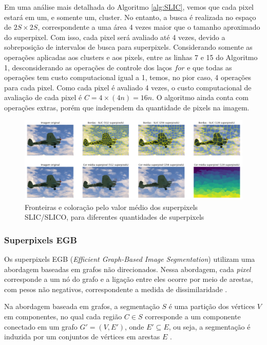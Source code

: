 \begin{document}
Em uma análise mais detalhada do Algoritmo \ref{alg:SLIC}, vemos que cada pixel estará em um, e somente um, cluster. No entanto, a busca é realizada no espaço de $2S \times 2S$, correspondente a uma área 4 vezes maior que o tamanho aproximado do superpixel. Com isso, cada pixel será avaliado até 4 vezes, devido a sobreposição de intervalos de busca para superpixels. Considerando somente as operações aplicadas aos clusters e aos pixels, entre as linhas 7 e 15 do Algoritmo 1, desconsiderando as operações de controle dos laços $for$ e que todas as operações tem custo computacional igual a 1, temos, no pior caso, 4 operações para cada pixel. Como cada pixel é avaliado 4 vezes, o custo computacional de avaliação de cada pixel é $C = 4 \times (4n) = 16n$. O algoritmo ainda conta com operações extras, porém que independem da quantidade de pixels na imagem. 

\begin{figure}[ht]
\centering
\includegraphics[width=1.\textwidth]{slic_segmentation_compare.png}
\caption{Fronteiras e coloração pelo valor médio dos superpixels SLIC/SLICO, para diferentes quantidades de superpixels}
\label{fig:SLICO}
\end{figure}


\subsubsection{Superpixels EGB} \label{sssec:egb}

Os superpixels EGB (\textit{Efficient Graph-Based Image Segmentation}) utilizam uma abordagem baseadas em grafos não direcionados. Nessa abordagem, cada \textit{pixel} corresponde a um nó do grafo e a ligação entre eles ocorre por meio de arestas, com pesos não negativos, correspondente a medida de dissimilaridade \cite{FELZENSZWALB}. 

Na abordagem baseada em grafos, a segmentação $S$ é uma partição dos vértices $V$ em componentes, no qual cada região $C \in S$ corresponde a um componente conectado em um grafo $G'=(V,E')$, onde $E' \subseteq E$, ou seja, a segmentação é induzida por um conjuntos de vértices em arestas $E$ \cite{FELZENSZWALB}.
\end{document}
